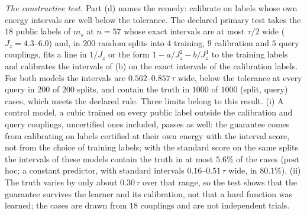 \documentclass[aps,prx,twocolumn,10pt,superscriptaddress,nofootinbib,longbibliography,floatfix]{revtex4-2}
\theoremstyle{remark}
\newcommand{\Jz}{J_z}
\newcommand{\ms}{m_s}
\begin{document}
\emph{The constructive test.} Part (d) names the remedy: calibrate on labels whose own energy intervals are well
below the tolerance. The declared primary test takes the $18$ public labels of $\ms$ at $n=57$ whose exact %
intervals are at most $\tau/2$ wide ($\Jz=4.3$--$6.0$) and, in $200$ random splits into $4$ training, $9$ %
calibration and $5$ query couplings, fits a line in $1/\Jz$ or the form $1-a/\Jz^2-b/\Jz^4$ to the training %
labels and calibrates the intervals of (b) on the exact intervals of the calibration labels. For both models the
intervals are $0.562$--$0.857\,\tau$ wide, below the tolerance at every query in $200$ of $200$ splits, and contain %
the truth in $1000$ of $1000$ (split, query) cases, which meets the declared rule. Three limits belong to this %
result. (i) A control model, a cubic trained on every public label outside the calibration and query couplings,
uncertified ones included, passes as well: the guarantee comes from calibrating on labels certified at their own
energy with the interval score, not from the choice of training labels; with the standard score on the same splits
the intervals of these models contain the truth in at most $5.6\%$ of the cases (post hoc; a constant predictor, with standard intervals $0.16$--$0.51\,\tau$ wide, in $80.1\%$). (ii) The truth varies by only about %
$0.30\,\tau$ over that range, so the test shows that the guarantee survives the learner and its calibration, not %
that a hard function was learned; the cases are drawn from $18$ couplings and are not independent trials. %
\end{document}
